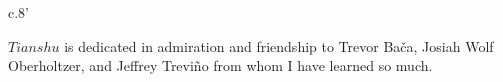 \documentclass[10pt]{article}
\begin{document}
\vspace*{3\baselineskip}

\begin{center}
c.8'
\end{center}

\vspace*{1\baselineskip}

\begin{center}
$Tianshu$ is dedicated in admiration and friendship to Trevor Ba\v{c}a, Josiah Wolf Oberholtzer, and Jeffrey Trevi\~{n}o from whom I have learned so much.
\end{center}
\end{document}
